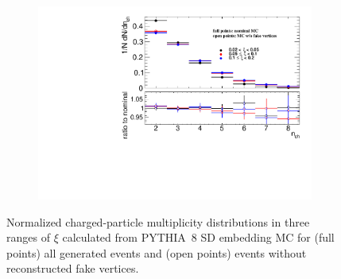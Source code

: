 \begin{figure}[t!]
	\begin{subfigure}{.46\textwidth}
		\includegraphics[width=\textwidth,page=1]{chapters/chrgSTAR/img/vertex/nchFake.pdf}
	\end{subfigure}
	\begin{minipage}{.47\textwidth}
		\hfill
		\begin{minipage}{0.95\textwidth}
			\caption{Normalized charged-particle multiplicity distributions in three ranges of $\xi$ calculated from PYTHIA~8 SD embedding  MC for (full points) all generated events and (open points) events without reconstructed fake vertices.}
			\label{fig:nchVertex}
		\end{minipage}
		
	\end{minipage}
	\vspace{1em}
	

\end{figure}
